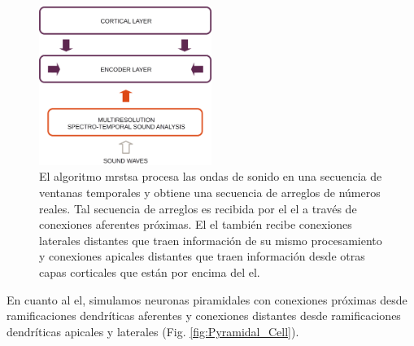 \begin{figure}[h!]
    \centering
    \includegraphics[width=0.5\textwidth]{DataFlow.png}
    \caption{El algoritmo \gls{mrstsa} procesa las ondas de sonido en una secuencia de ventanas temporales y obtiene una secuencia de arreglos de números reales. Tal secuencia de arreglos es recibida por el \gls{el} a través de conexiones aferentes próximas. El \gls{el} también recibe conexiones laterales distantes que traen información de su mismo procesamiento y conexiones apicales distantes que traen información desde otras capas corticales que están por encima del \gls{el}.}
    \label{fig:DataFlow}
\end{figure}

En cuanto al \gls{el}, simulamos neuronas piramidales con conexiones próximas desde ramificaciones dendríticas aferentes y conexiones distantes desde ramificaciones dendríticas apicales y laterales (Fig. \ref{fig:Pyramidal_Cell}).


